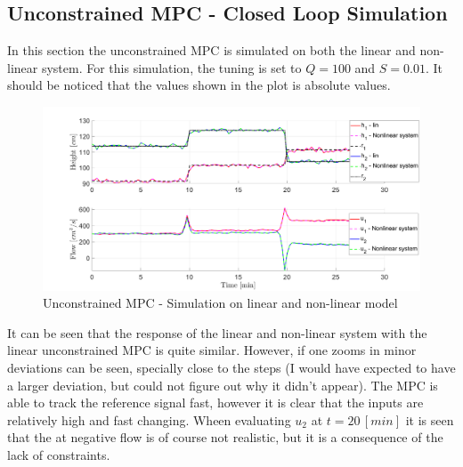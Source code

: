 \subsection{Unconstrained MPC - Closed Loop Simulation}
In this section the unconstrained MPC is simulated on both the linear and non-linear system. For this simulation, the tuning is set to $Q=100$ and $S=0.01$. It should be noticed that the values shown in the plot is absolute values.
\begin{figure}[H]
    \centering
    \includegraphics[width=1\textwidth]{Figures/Pr10.1_Uncon_MPC.png}
    \caption{Unconstrained MPC - Simulation on linear and non-linear model}
\end{figure}
It can be seen that the response of the linear and non-linear system with the linear unconstrained MPC is quite similar. However, if one zooms in minor deviations can be seen, specially close to the steps (I would have expected to have a larger deviation, but could not figure out why it didn't appear). The MPC is able to track the reference signal fast, however it is clear that the inputs are relatively high and fast changing. Wheen evaluating $u_2$ at $t=20\,[min]$ it is seen that the at negative flow is of course not realistic, but it is a consequence of the lack of constraints. 